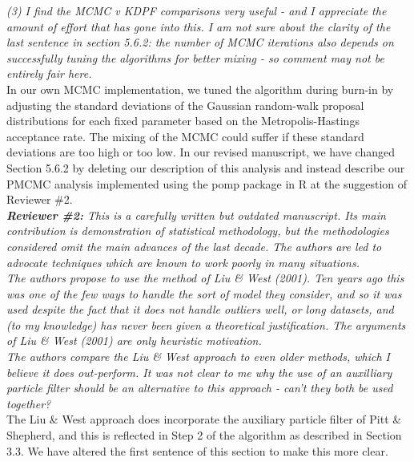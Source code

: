 \documentclass{article}
\begin{document}
\noindent \emph{(3) I find the MCMC v KDPF comparisons very useful - and I appreciate the amount of effort that has gone into this. I am not sure about the clarity of the last sentence in section 5.6.2: the number of MCMC iterations also depends on successfully tuning the algorithms for better mixing - so comment may not be entirely fair here.} \\

In our own MCMC implementation, we tuned the algorithm during burn-in by adjusting the standard deviations of the Gaussian random-walk proposal distributions for each fixed parameter based on the Metropolis-Hastings acceptance rate. The mixing of the MCMC could suffer if these standard deviations are too high or too low. In our revised manuscript, we have changed Section 5.6.2 by deleting our description of this analysis and instead describe our PMCMC analysis implemented using the pomp package in R at the suggestion of Reviewer \#2. \\

\noindent \emph{{\bf Reviewer \#2:} This is a carefully written but outdated manuscript. Its main contribution is demonstration of statistical methodology, but the methodologies considered omit the main advances of the last decade. The authors are led to advocate techniques which are known to work poorly in many situations.} \\

\noindent \emph{The authors propose to use the method of Liu \& West (2001). Ten years ago this was one of the few ways to handle the sort of model they consider, and so it was used despite the fact that it does not handle outliers well, or long datasets, and (to my knowledge) has never been given a theoretical justification. The arguments of Liu \& West (2001) are only heuristic motivation.} \\

\noindent \emph{The authors compare the Liu \& West approach to even older methods, which I believe it does out-perform. It was not clear to me why the use of an auxilliary particle filter should be an alternative to this approach - can't they both be used together?} \\

The Liu \& West approach does incorporate the auxiliary particle filter of Pitt \& Shepherd, and this is reflected in Step 2 of the algorithm as described in Section 3.3. We have altered the first sentence of this section to make this more clear. \\
\end{document}
